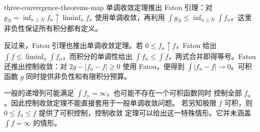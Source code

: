 \begin{solution}{three-convergence-theorems-map}
单调收敛定理推出 Fatou 引理：对
\(g_N=\inf_{n\ge N}f_n\uparrow\liminf_nf_n\) 使用单调收敛，再利用
\(\int g_N\le\inf_{n\ge N}\int f_n\)。这里非负性保证所有积分都有定义。

反过来，Fatou 引理也推出单调收敛定理。若
\(0\le f_n\uparrow f\)，Fatou 给出
\(\int f\le\liminf_n\int f_n\)，而积分的单调性给出
\(\int f_n\le\int f\)，两式合并即得等号。Fatou 还推出控制收敛：对
\(2g-|f_n-f|\ge0\) 使用 Fatou，便得到
\(\int|f_n-f|\to0\)。可积函数 \(g\) 同时提供非负性和有限积分预算。

一般的递增列可能满足 \(\int f_n=\infty\)，也可能不存在一个可积函数同时
控制全部 \(f_n\)。因此控制收敛定理不能直接套用于一般单调收敛问题。
若另知极限 \(f\) 可积，则 \(0\le f_n\le f\) 提供了可积控制，控制收敛
定理可以给出这一特殊情形。它并未涵盖 \(\int f=\infty\) 的情形。
\end{solution}
